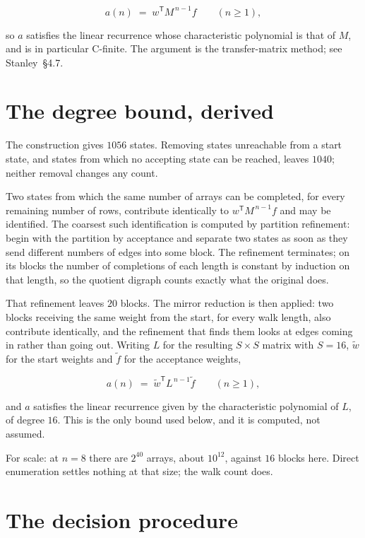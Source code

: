 \documentclass[11pt]{article}
\theoremstyle{definition}
\begin{document}
\[a(n) \;=\; w^{\mathsf T} M^{\,n-1} f \qquad (n \ge 1),\]

so $a$ satisfies the linear recurrence whose characteristic polynomial is that of $M$, and is in particular C-finite. The argument is the transfer-matrix method; see Stanley~\S4.7.

\section{The degree bound, derived}

The construction gives $1056$ states. Removing states unreachable from a start state, and states from which no accepting state can be reached, leaves $1040$; neither removal changes any count.

Two states from which the same number of arrays can be completed, for every remaining number of rows, contribute identically to $w^{\mathsf T}M^{\,n-1}f$ and may be identified. The coarsest such identification is computed by partition refinement: begin with the partition by acceptance and separate two states as soon as they send different numbers of edges into some block. The refinement terminates; on its blocks the number of completions of each length is constant by induction on that length, so the quotient digraph counts exactly what the original does.

That refinement leaves $20$ blocks. The mirror reduction is then applied: two blocks receiving the same weight from the start, for every walk length, also contribute identically, and the refinement that finds them looks at edges coming in rather than going out. Writing $L$ for the resulting $S \times S$ matrix with $S = 16$, $\tilde w$ for the start weights and $\tilde f$ for the acceptance weights,

\[a(n) \;=\; \tilde w^{\mathsf T} L^{\,n-1} \tilde f \qquad (n \ge 1),\]

and $a$ satisfies the linear recurrence given by the characteristic polynomial of $L$, of degree $16$. This is the only bound used below, and it is computed, not assumed.

For scale: at $n = 8$ there are $2^{40}$ arrays, about $10^{12}$, against $16$ blocks here. Direct enumeration settles nothing at that size; the walk count does.

\section{The decision procedure}
\end{document}
